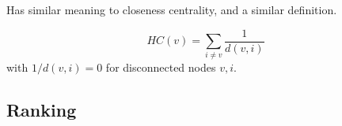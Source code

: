 Has similar meaning to closeness centrality, and a similar definition.

\begin{definition}
    \[HC(v) = \sum_{i \neq v} \frac{1}{d(v, i)}\]
    with $1 / d(v, i) = 0$ for disconnected nodes $v, i$.
\end{definition}

%
%
%

%
%
%
%

\subsection{Ranking}


